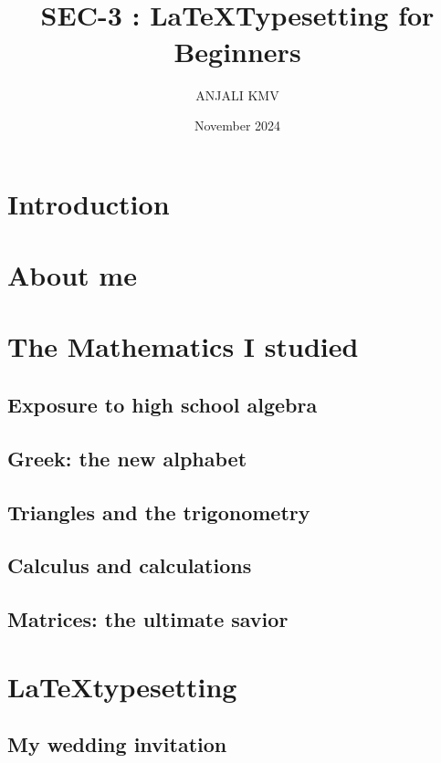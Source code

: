 \documentclass[12pt, a4paper]{article}
\title{\boldsymbol{ASSIGNMENT}\\ 
{SEC-3 : \LaTeX  Typesetting for Beginners}}
\author{ANJALI KMV}
\date{November 2024}
\begin{document}
\maketitle 

\tableofcontents

\section{Introduction}
\section{About me}
\section{The Mathematics I studied}
\subsection{Exposure to high school algebra}
\subsection{Greek: the new alphabet}
\subsection{Triangles and the trigonometry}
\subsection{ Calculus and calculations}
\subsection{Matrices: the ultimate savior}
\section{\LaTeX  typesetting}
\subsection{My wedding invitation}
\newpage
\end{document}
